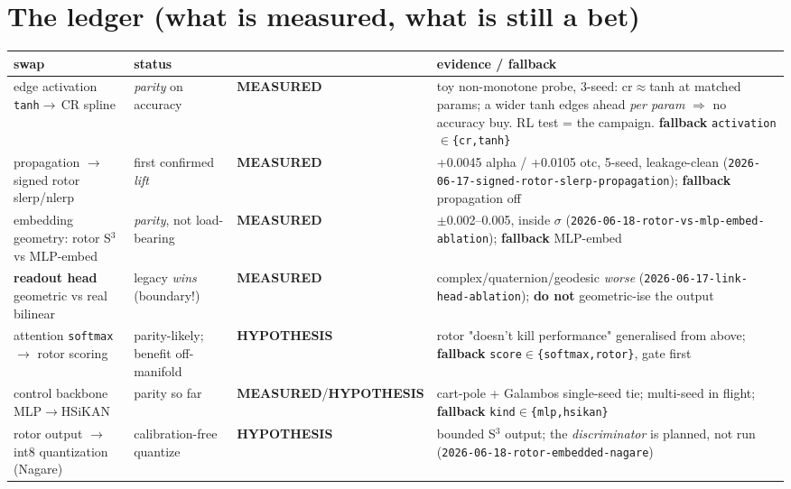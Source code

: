 \documentclass[11pt]{article}
\newcommand{\code}[1]{\texttt{\small #1}}
\newcommand{\meas}{\textcolor{green!50!black}{\textbf{MEASURED}}}
\newcommand{\hyp}{\textcolor{orange!80!black}{\textbf{HYPOTHESIS}}}
\begin{document}
\section*{The ledger (what is measured, what is still a bet)}
\renewcommand{\arraystretch}{1.25}
\begin{center}\small
\begin{tabular}{>{\raggedright\arraybackslash}p{} >{\raggedright\arraybackslash}p{} l >{\raggedright\arraybackslash}p{}}
\toprule
swap & status & & evidence / fallback \\
\midrule
edge activation \code{tanh}$\to$\,CR spline & \emph{parity} on accuracy & \meas &
  toy non-monotone probe, 3-seed: cr$\approx$tanh at matched params; a wider tanh edges ahead \emph{per param}
  $\Rightarrow$ no accuracy buy. RL test = the campaign. \textbf{fallback} \code{activation$\in$\{cr,tanh\}} \\
propagation $\to$ signed rotor slerp/nlerp & first confirmed \emph{lift} & \meas &
  +0.0045 alpha / +0.0105 otc, 5-seed, leakage-clean (\code{2026-06-17-signed-rotor-slerp-propagation}); \textbf{fallback} propagation off \\
embedding geometry: rotor S$^3$ vs MLP-embed & \emph{parity}, not load-bearing & \meas &
  $\pm$0.002--0.005, inside $\sigma$ (\code{2026-06-18-rotor-vs-mlp-embed-ablation}); \textbf{fallback} MLP-embed \\
\textbf{readout head} geometric vs real bilinear & legacy \emph{wins} (boundary!) & \meas &
  complex/quaternion/geodesic \emph{worse} (\code{2026-06-17-link-head-ablation}); \textbf{do not} geometric-ise the output \\
attention \code{softmax}$\to$ rotor scoring & parity-likely; benefit off-manifold & \hyp &
  rotor "doesn't kill performance" generalised from above; \textbf{fallback} \code{score$\in$\{softmax,rotor\}}, gate first \\
control backbone MLP$\to$HSiKAN & parity so far & \meas/\hyp &
  cart-pole + Galambos single-seed tie; multi-seed in flight; \textbf{fallback} \code{kind$\in$\{mlp,hsikan\}} \\
rotor output $\to$ int8 quantization (Nagare) & calibration-free quantize & \hyp &
  bounded S$^3$ output; the \emph{discriminator} is planned, not run (\code{2026-06-18-rotor-embedded-nagare}) \\
\bottomrule
\end{tabular}
\end{center}
\end{document}
